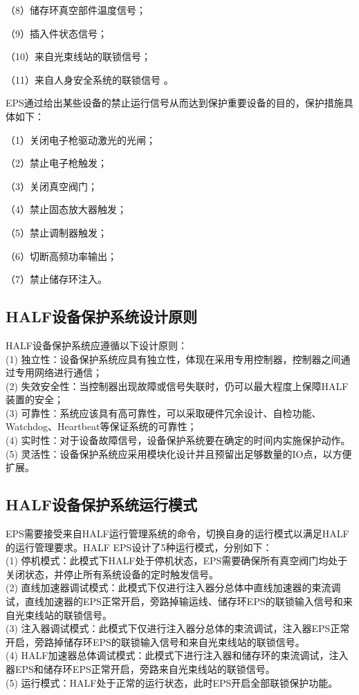 （8）储存环真空部件温度信号；

（9）插入件状态信号；

（10）来自光束线站的联锁信号；

（11）来自人身安全系统的联锁信号 。


EPS通过给出某些设备的禁止运行信号从而达到保护重要设备的目的，保护措施具体如下：

（1）关闭电子枪驱动激光的光闸；

（2）禁止电子枪触发；

（3）关闭真空阀门；

（4）禁止固态放大器触发；

（5）禁止调制器触发；

（6）切断高频功率输出；

（7）禁止储存环注入。


\subsection{HALF设备保护系统设计原则}

HALF设备保护系统应遵循以下设计原则：\\
(1) 独立性：设备保护系统应具有独立性，体现在采用专用控制器，控制器之间通过专用网络进行通信；\\
(2) 失效安全性：当控制器出现故障或信号失联时，仍可以最大程度上保障HALF装置的安全；\\
(3) 可靠性：系统应该具有高可靠性，可以采取硬件冗余设计、自检功能、 Watchdog、Heartbeat等保证系统的可靠性；\\
(4) 实时性：对于设备故障信号，设备保护系统要在确定的时间内实施保护动作。\\
(5) 灵活性：设备保护系统应采用模块化设计并且预留出足够数量的IO点，以方便扩展。

\subsection{HALF设备保护系统运行模式}

EPS需要接受来自HALF运行管理系统的命令，切换自身的运行模式以满足HALF的运行管理要求。HALF EPS设计了5种运行模式，分别如下：\\
(1) 停机模式：此模式下HALF处于停机状态，EPS需要确保所有真空阀门均处于关闭状态，并停止所有系统设备的定时触发信号。\\
(2) 直线加速器调试模式：此模式下仅进行注入器分总体中直线加速器的束流调试，直线加速器的EPS正常开启，旁路掉输运线、储存环EPS的联锁输入信号和来自光束线站的联锁信号。\\
(3) 注入器调试模式：此模式下仅进行注入器分总体的束流调试，注入器EPS正常开启，旁路掉储存环EPS的联锁输入信号和来自光束线站的联锁信号。\\
(4) HALF加速器总体调试模式：此模式下进行注入器和储存环的束流调试，注入器EPS和储存环EPS正常开启，旁路来自光束线站的联锁信号。\\
(5) 运行模式：HALF处于正常的运行状态，此时EPS开启全部联锁保护功能。

